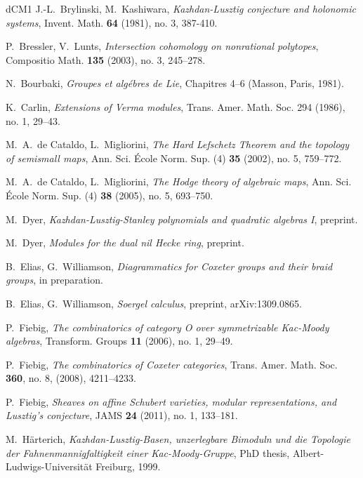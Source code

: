 \documentclass[11pt]{amsart}
\numberwithin{equation}{section}
\theoremstyle{definition}
\theoremstyle{remark}
\begin{document}
{\begin{thebibliography}{dCM1}
J.-L.~Brylinski, M.~Kashiwara, \textit{Kazhdan-Lusztig conjecture and
  holonomic systems}, Invent. Math. \textbf{64} (1981), no. 3,
387-410.

P.~Bressler, V.~Lunts,
\textit{Intersection cohomology on nonrational polytopes},
Compositio Math. \textbf{135} (2003), no. 3, 245--278.

N.~Bourbaki, \emph{Groupes et alg\'ebres de Lie}, Chapitres 4--6 (Masson, Paris, 1981).

K.~Carlin, \textit{Extensions of Verma modules},
Trans. Amer. Math. Soc. 294 (1986), no. 1, 29--43. 

M.~A.~de Cataldo, L.~Migliorini, \textit{The Hard Lefschetz Theorem
  and the topology of semismall maps},  Ann. Sci. \'Ecole Norm. Sup. (4) \textbf{35} (2002), no. 5, 759--772.

M.~A.~de Cataldo, L.~Migliorini, \textit{The Hodge theory of algebraic
maps},  Ann. Sci. \'Ecole Norm. Sup. (4) \textbf{38} (2005), no. 5, 693--750.

M.~Dyer, \textit{Kazhdan-Lusztig-Stanley polynomials and quadratic
  algebras I}, preprint.

M.~Dyer,  \textit{Modules for the dual nil Hecke ring}, preprint.

B.~Elias, G.~Williamson, \textit{Diagrammatics for Coxeter groups and
  their braid groups}, in preparation.

B.~Elias, G.~Williamson, \textit{Soergel calculus}, preprint, arXiv:1309.0865.


P.~Fiebig, \textit{The combinatorics of category O over symmetrizable
  Kac-Moody algebras}, Transform. Groups \textbf{11} (2006), no. 1, 29--49. 

P.~Fiebig, \textit{The combinatorics of Coxeter categories}, 
Trans. Amer. Math. Soc. \textbf{360}, no. 8, (2008), 4211--4233. 

P.~Fiebig, \textit{Sheaves on affine Schubert varieties, modular
  representations, and Lusztig's conjecture}, 
JAMS \textbf{24} (2011), no. 1, 133--181.

M.~H\"arterich,
\textit{Kazhdan-Lusztig-Basen, unzerlegbare Bimoduln und die Topologie
  der Fahnenmannigfaltigkeit einer Kac-Moody-Gruppe}, PhD thesis,
Albert-Ludwigs-Universit\"at Freiburg, 1999.


\end{thebibliography}}
\end{document}
